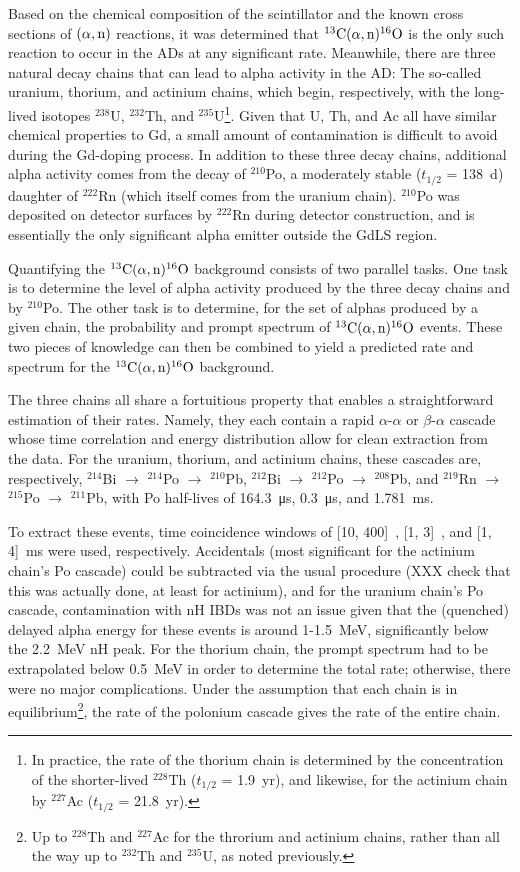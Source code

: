 \documentclass[../thesis.tex]{subfiles}
\begin{document}
Based on the chemical composition of the scintillator and the known cross sections of $(\alpha,\mathrm{n})$ reactions, it was determined that $^{13}\mathrm{C}(\alpha, \mathrm{n})^{16}\mathrm{O}$ is the only such reaction to occur in the ADs at any significant rate. Meanwhile, there are three natural decay chains that can lead to alpha activity in the AD: The so-called uranium, thorium, and actinium chains, which begin, respectively, with the long-lived isotopes $^{238}$U, $^{232}$Th, and $^{235}$U\footnote{In practice, the rate of the thorium chain is determined by the concentration of the shorter-lived $^{228}$Th ($t_{1/2}$ = 1.9~yr), and likewise, for the actinium chain by $^{227}$Ac ($t_{1/2}$ = 21.8~yr).}. Given that U, Th, and Ac all have similar chemical properties to Gd, a small amount of contamination is difficult to avoid during the Gd-doping process. In addition to these three decay chains, additional alpha activity comes from the decay of $^{210}$Po, a moderately stable ($t_{1/2}$ = 138~d) daughter of $^{222}$Rn (which itself comes from the uranium chain). $^{210}$Po was deposited on detector surfaces by $^{222}$Rn during detector construction, and is essentially the only significant alpha emitter outside the GdLS region.

Quantifying the $^{13}\mathrm{C}(\alpha, \mathrm{n})^{16}\mathrm{O}$ background consists of two parallel tasks. One task is to determine the level of alpha activity produced by the three decay chains and by $^{210}$Po. The other task is to determine, for the set of alphas produced by a given chain, the probability and prompt spectrum of $^{13}\mathrm{C}(\alpha, \mathrm{n})^{16}\mathrm{O}$ events. These two pieces of knowledge can then be combined to yield a predicted rate and spectrum for the $^{13}\mathrm{C}(\alpha, \mathrm{n})^{16}\mathrm{O}$ background.

The three chains all share a fortuitious property that enables a straightforward estimation of their rates. Namely, they each contain a rapid $\alpha$-$\alpha$ or $\beta$-$\alpha$ cascade whose time correlation and energy distribution allow for clean extraction from the data. For the uranium, thorium, and actinium chains, these cascades are, respectively, $^{214}$Bi $\to$ $^{214}$Po $\to$ $^{210}$Pb, $^{212}$Bi $\to$ $^{212}$Po $\to$ $^{208}$Pb, and $^{219}$Rn $\to$ $^{215}$Po $\to$ $^{211}$Pb, with Po half-lives of \SI{164.3}{\micro s}, \SI{0.3}{\micro s}, and \SI{1.781}{ms}.

To extract these events, time coincidence windows of [10, 400]~\us, [1, 3]~\us, and [1, 4]~ms were used, respectively. Accidentals (most significant for the actinium chain's Po cascade) could be subtracted via the usual procedure (XXX check that this was actually done, at least for actinium), and for the uranium chain's Po cascade, contamination with nH IBDs was not an issue given that the (quenched) delayed alpha energy for these events is around 1-1.5~MeV, significantly below the 2.2~MeV nH peak. For the thorium chain, the prompt spectrum had to be extrapolated below 0.5~MeV in order to determine the total rate; otherwise, there were no major complications. Under the assumption that each chain is in equilibrium\footnote{Up to $^{228}$Th and $^{227}$Ac for the throrium and actinium chains, rather than all the way up to $^{232}$Th and $^{235}$U, as noted previously.}, the rate of the polonium cascade gives the rate of the entire chain.
\end{document}
